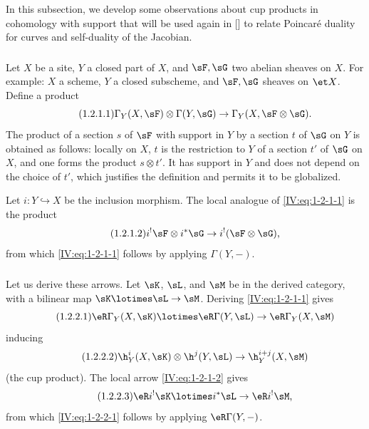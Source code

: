 In this subsection, we develop some observations about cup products in
cohomology with support that will be used again in [] to relate
Poincaré duality for curves and self-duality of the Jacobian.

\subsubsection{}\label{IV:1-2-1}

Let $X$ be a site, $Y$ a closed part of $X$, and $\sF,\sG$ two abelian
sheaves on $X$. For example: $X$ a scheme, $Y$ a closed subscheme, and
$\sF,\sG$ sheaves on $\et X$. Define a product
\begin{equation*}\tag{1.2.1.1}\label{IV:eq:1-2-1-1}
  \Gamma_Y(X,\sF)\otimes \Gamma(Y,\sG) \to \Gamma_Y(X,\sF\otimes\sG) \text{.}
\end{equation*}
The product of a section $s$ of $\sF$ with support in $Y$ by a section $t$ of
$\sG$ on $Y$ is obtained as follows: locally on $X$, $t$ is the restriction
to $Y$ of a section $t'$ of $\sG$ on $X$, and one forms the product
$s\otimes t'$. It has support in $Y$ and does not depend on the choice of
$t'$, which justifies the definition and permits it to be globalized.

Let $i:Y\hookrightarrow X$ be the inclusion morphism. The local analogue of
\eqref{IV:eq:1-2-1-1} is the product
\begin{equation*}\tag{1.2.1.2}\label{IV:eq:1-2-1-2}
  i^!\sF\otimes i^*\sG \to i^!(\sF\otimes\sG) \text{,}
\end{equation*}
from which \eqref{IV:eq:1-2-1-1} follows by applying $\Gamma(Y,-)$.






\subsubsection{}\label{IV:1-2-2}

Let us derive these arrows. Let $\sK$, $\sL$, and $\sM$ be in the derived
category, with a bilinear map $\sK\lotimes\sL\to\sM$. Deriving
\eqref{IV:eq:1-2-1-1} gives
\begin{equation*}\tag{1.2.2.1}\label{IV:eq:1-2-2-1}
  \eR\Gamma_Y(X,\sK) \lotimes \eR\Gamma(Y,\sL) \to \eR\Gamma_Y(X,\sM)
\end{equation*}
inducing
\begin{equation*}\tag{1.2.2.2}\label{IV:eq:1-2-2-2}
  \h_Y^i(X,\sK)\otimes \h^j(Y,\sL) \to \h_Y^{i+j}(X,\sM)
\end{equation*}
(the cup product). The local arrow \eqref{IV:eq:1-2-1-2} gives
\begin{equation*}\tag{1.2.2.3}\label{IV:eq:1-2-2-3}
  \eR i^! \sK\lotimes i^*\sL \to \eR i^!\sM \text{,}
\end{equation*}
from which \eqref{IV:eq:1-2-2-1} follows by applying $\eR\Gamma(Y,-)$.





